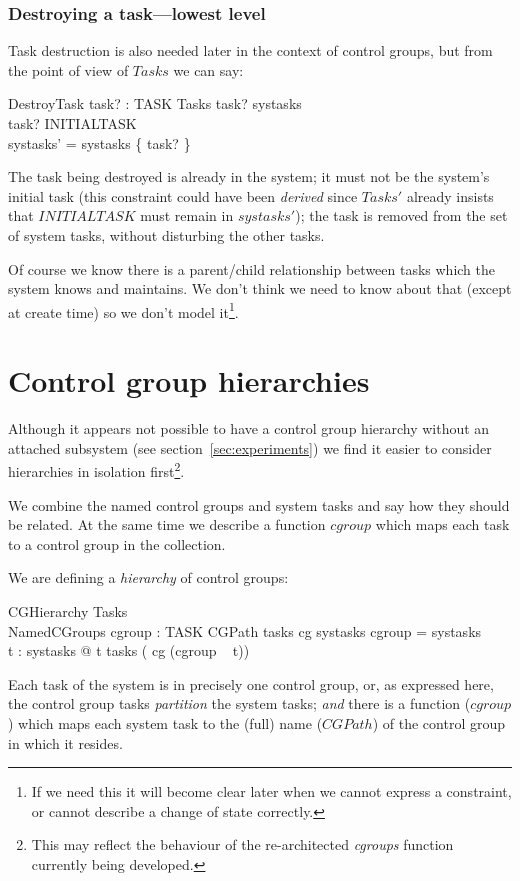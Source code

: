 \documentclass[a4paper,twoside,12pt]{article}
\begin{document}
\subsubsection{Destroying a task---lowest level}

Task destruction is also needed later in the context of control groups, but from the point of view of $Tasks$ we can say:

\begin{schema}{DestroyTask}
task? : TASK
\also
\Delta Tasks
\where
task? \in systasks \\
task? \neq INITIALTASK \\
systasks'  = systasks \setminus \{ task? \}
\end{schema}
The task being destroyed is already in the system; it must not be the system's initial task
(this constraint could have been \emph{derived} since $Tasks'$ already insists that $INITIALTASK$
must remain in $systasks'$);
the task is removed from the set of system tasks, without disturbing the other tasks.

Of course we know there is a parent/child relationship between tasks which the system knows and maintains.
We don't think we need to know about that (except at create time) so we don't model
it\footnote{If we need this it will become clear later when we cannot express a constraint,
or cannot describe a change of state correctly.}.

\section{Control group hierarchies}
\label{sec:cgh}

Although it appears not possible to have a control group hierarchy without an attached subsystem
(see section~\ref{sec:experiments}) we find it easier to consider hierarchies in isolation 
first\footnote{This may reflect the behaviour of the re-architected \emph{cgroups} function currently being developed.}.

We combine the named control groups and system tasks and say how they should be related.
At the same time we describe a function $cgroup$ which maps each task to a control group in the collection.

We are defining a \emph{hierarchy} of control groups:

\begin{schema}{CGHierarchy}
Tasks \\
NamedCGroups
\also
cgroup : TASK \ffun CGPath
\where
tasks \circ cg \partition systasks
\also
\dom cgroup = systasks \\
\forall t : systasks @ t \in tasks ( cg (cgroup ~ t))
\end{schema}
Each task of the system is in precisely one control group, or, as expressed here,
the control group tasks \emph{partition} the system tasks;
\emph{and} there is a function ($cgroup$) which maps each system task to the (full) name
($CGPath$) of the control group in which it resides.
\end{document}
